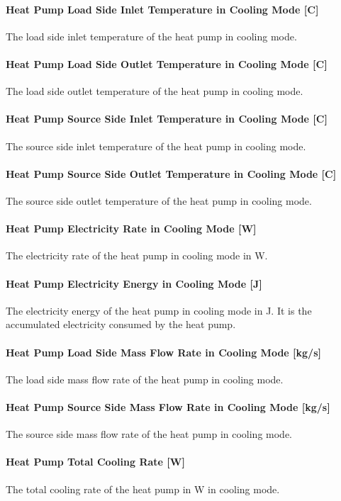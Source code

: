\paragraph{Heat Pump Load Side Inlet Temperature in Cooling Mode {[}C{]}} The
load side inlet temperature of the heat pump in cooling mode.
\paragraph{Heat Pump Load Side Outlet Temperature in Cooling Mode {[}C{]}} The
load side outlet temperature of the heat pump in cooling mode.
\paragraph{Heat Pump Source Side Inlet Temperature in Cooling Mode {[}C{]}} The
source side inlet temperature of the heat pump in cooling mode.
\paragraph{Heat Pump Source Side Outlet Temperature in Cooling Mode {[}C{]}} The
source side outlet temperature of the heat pump in cooling mode.
\paragraph{Heat Pump Electricity Rate in Cooling Mode {[}W{]}} The electricity
rate of the heat pump in cooling mode in W.
\paragraph{Heat Pump Electricity Energy in Cooling Mode {[}J{]}} The electricity
energy of the heat pump in cooling mode in J. It is the accumulated electricity
consumed by the heat pump.
\paragraph{Heat Pump Load Side Mass Flow Rate in Cooling Mode {[}kg/s{]}} The
load side mass flow rate of the heat pump in cooling mode.
\paragraph{Heat Pump Source Side Mass Flow Rate in Cooling Mode {[}kg/s{]}} The
source side mass flow rate of the heat pump in cooling mode.
\paragraph{Heat Pump Total Cooling Rate {[}W{]}} The total cooling rate of the
heat pump in W in cooling mode.
